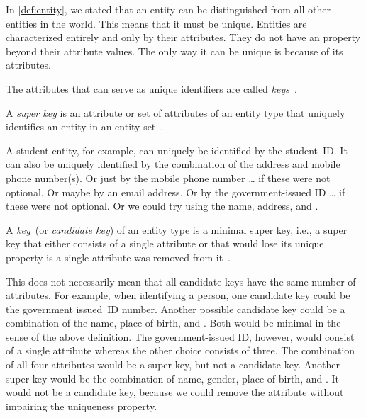 %
\label{sec:conceptualKeys}%
%
In \cref{def:entity}, we stated that an entity can be distinguished from all other entities in the world.
This means that it must be unique.
Entities are characterized entirely and only by their attributes.
They do not have an property beyond their attribute values.
The only way it can be unique is because of its attributes.

The attributes that can serve as unique identifiers are called \emph{keys}~\cite{S2024D:CDMERDE}.%
%
\begin{definition}%
\label{def:superKey}%
A \emph{super key} is an attribute or set of attributes of an entity type that uniquely identifies an entity in an entity set~\cite{S2024D:CDMERDE,G2011EW2ITDS:CMUTERM}.%
\end{definition}%
%
A student entity, for example, can uniquely be identified by the student~ID.
It can also be uniquely identified by the combination of the address and mobile phone number(s).
Or just by the mobile phone number {\dots} if these were not optional.
Or maybe by an email address.
Or by the government-issued ID {\dots} if these were not optional.
Or we could try using the name, address, and .%
%
\begin{definition}%
\label{def:key}%
A \emph{key}~(or \emph{candidate key}) of an entity type is a minimal super key, i.e., a super key that either consists of a single attribute or that would lose its unique property is a single attribute was removed from it~\cite{S2024D:CDMERDE,G2011EW2ITDS:CMUTERM,SS2005EIDDDFDB:SDLDUTRDM}.%
\end{definition}%
%
This does not necessarily mean that all candidate keys have the same number of attributes.
For example, when identifying a person, one candidate key could be the government issued~ID number.
Another possible candidate key could be a combination of the name, place of birth, and .
Both would be minimal in the sense of the above definition.
The government-issued ID, however, would consist of a single attribute whereas the other choice consists of three.
The combination of all four attributes would be a super key, but not a candidate key.
Another super key would be the combination of name, gender, place of birth, and .
It would not be a candidate key, because we could remove the attribute  without impairing the uniqueness property.

